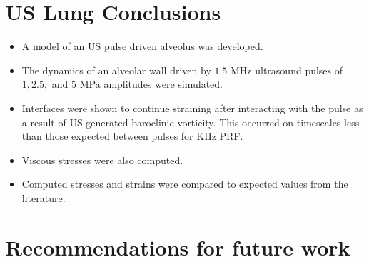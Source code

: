 \section{US Lung Conclusions}
\begin{itemize}
\item A model of an US pulse driven alveolus was developed.
\item The dynamics of an alveolar wall driven by $1.5$ MHz ultrasound
  pulses of $1, 2.5,$ and $5$ MPa amplitudes were simulated.
\item Interfaces were shown to continue straining after interacting
  with the pulse as a result of US-generated baroclinic vorticity. This
  occurred on timescales less than those expected between pulses for KHz
  PRF.
\item Viscous stresses were also computed.
\item Computed stresses and strains were compared to expected values
  from the literature.
\end{itemize}


\section{Recommendations for future work}